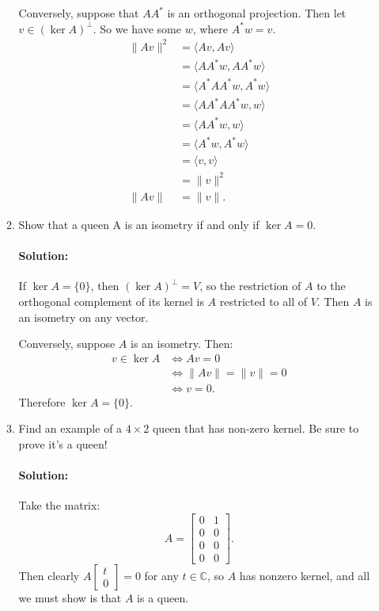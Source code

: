 \documentclass{article}
\begin{document}
\begin{enumerate}
\begin{enumerate}[label= (\alph*)]
    Conversely, suppose that $AA^*$ is an orthogonal projection. Then let $v\in (\ker A)^{\perp}$. So we have some $w$, where  $A^* w=v$.
    \begin{align*}
        \|Av\|^2&= \langle Av,Av \rangle \\
        &= \langle A A^* w,A A^* w \rangle \\
        &= \langle A^* A A^* w, A^* w \rangle \\
        &= \langle AA^* A A^* w,  w \rangle \\
        &= \langle  A A^* w,  w \rangle \\
        &= \langle   A^* w,  A^* w \rangle \\
        &= \langle   v, v \rangle \\
        &= \|v\|^2\\
        \|Av\|&=\|v\|
    .\end{align*}%

\item Show that a queen A is an isometry if and only if $\ker A = {0}$.

    \paragraph{Solution: }If $\ker A=\{0\} $, then $(\ker A)^{\perp}=V$, so the restriction of $A$ to the orthogonal complement of its kernel is $A$ restricted to all of $V$. Then $A$ is an isometry on any vector.

    Conversely, suppose $A$ is an isometry. Then:
    \begin{align*}
        v\in \ker A&\iff Av=0\\
                   &\iff \|Av\|=\|v\|=0\\
                   &\iff v=0
    .\end{align*}
    Therefore $\ker A=\{0\} $. 

\item Find an example of a $4 \times  2$ queen that has non-zero kernel. Be sure to prove it's a queen!
    \paragraph{Solution: }Take the matrix:
    \[
        A=\begin{bmatrix} 0&1\\0&0\\ 0&0\\0&0  \end{bmatrix} 
    .\] 
    Then clearly $A\begin{bmatrix} t\\0 \end{bmatrix} =0$ for any $t\in \mathbb{C}$, so $A$ has nonzero kernel, and all we must show is that $A$ is a queen.


\end{enumerate}
\end{enumerate}
\end{document}
